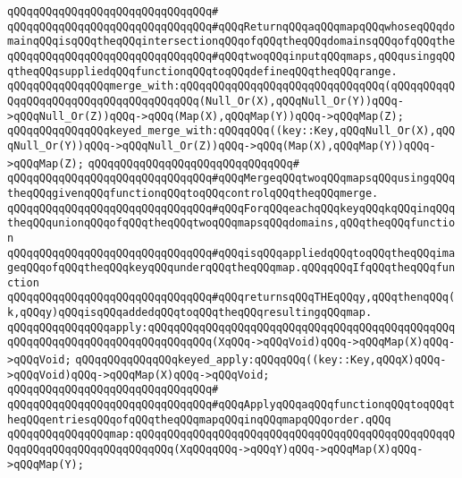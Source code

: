 \verb|qQQqqQQqqQQqqQQqqQQqqQQqqQQqqQQq#|\newline
\verb|qQQqqQQqqQQqqQQqqQQqqQQqqQQqqQQq#qQQqReturnqQQqaqQQqmapqQQqwhoseqQQqdomainqQQqisqQQqtheqQQqintersectionqQQqofqQQqtheqQQqdomainsqQQqofqQQqthe|\newline
\verb|qQQqqQQqqQQqqQQqqQQqqQQqqQQqqQQq#qQQqtwoqQQqinputqQQqmaps,qQQqusingqQQqtheqQQqsuppliedqQQqfunctionqQQqtoqQQqdefineqQQqtheqQQqrange.|\newline
\newline
\verb|qQQqqQQqqQQqqQQqmerge_with:qQQqqQQqqQQqqQQqqQQqqQQqqQQqqQQq(qQQqqQQqqQQqqQQqqQQqqQQqqQQqqQQqqQQqqQQq(Null_Or(X),qQQqNull_Or(Y))qQQq->qQQqNull_Or(Z))qQQq->qQQq(Map(X),qQQqMap(Y))qQQq->qQQqMap(Z);|\newline
\verb|qQQqqQQqqQQqqQQqkeyed_merge_with:qQQqqQQq((key::Key,qQQqNull_Or(X),qQQqNull_Or(Y))qQQq->qQQqNull_Or(Z))qQQq->qQQq(Map(X),qQQqMap(Y))qQQq->qQQqMap(Z);|\newline
\verb|qQQqqQQqqQQqqQQqqQQqqQQqqQQqqQQq#|\newline
\verb|qQQqqQQqqQQqqQQqqQQqqQQqqQQqqQQq#qQQqMergeqQQqtwoqQQqmapsqQQqusingqQQqtheqQQqgivenqQQqfunctionqQQqtoqQQqcontrolqQQqtheqQQqmerge.|\newline
\verb|qQQqqQQqqQQqqQQqqQQqqQQqqQQqqQQq#qQQqForqQQqeachqQQqkeyqQQqkqQQqinqQQqtheqQQqunionqQQqofqQQqtheqQQqtwoqQQqmapsqQQqdomains,qQQqtheqQQqfunction|\newline
\verb|qQQqqQQqqQQqqQQqqQQqqQQqqQQqqQQq#qQQqisqQQqappliedqQQqtoqQQqtheqQQqimageqQQqofqQQqtheqQQqkeyqQQqunderqQQqtheqQQqmap.qQQqqQQqIfqQQqtheqQQqfunction|\newline
\verb|qQQqqQQqqQQqqQQqqQQqqQQqqQQqqQQq#qQQqreturnsqQQqTHEqQQqy,qQQqthenqQQq(k,qQQqy)qQQqisqQQqaddedqQQqtoqQQqtheqQQqresultingqQQqmap.|\newline
\newline
\verb|qQQqqQQqqQQqqQQqapply:qQQqqQQqqQQqqQQqqQQqqQQqqQQqqQQqqQQqqQQqqQQqqQQqqQQqqQQqqQQqqQQqqQQqqQQqqQQqqQQq(XqQQq->qQQqVoid)qQQq->qQQqMap(X)qQQq->qQQqVoid;|\newline
\verb|qQQqqQQqqQQqqQQqkeyed_apply:qQQqqQQq((key::Key,qQQqX)qQQq->qQQqVoid)qQQq->qQQqMap(X)qQQq->qQQqVoid;|\newline
\verb|qQQqqQQqqQQqqQQqqQQqqQQqqQQqqQQq#|\newline
\verb|qQQqqQQqqQQqqQQqqQQqqQQqqQQqqQQq#qQQqApplyqQQqaqQQqfunctionqQQqtoqQQqtheqQQqentriesqQQqofqQQqtheqQQqmapqQQqinqQQqmapqQQqorder.qQQq|\newline
\newline
\verb|qQQqqQQqqQQqqQQqmap:qQQqqQQqqQQqqQQqqQQqqQQqqQQqqQQqqQQqqQQqqQQqqQQqqQQqqQQqqQQqqQQqqQQqqQQqqQQq(XqQQqqQQq->qQQqY)qQQq->qQQqMap(X)qQQq->qQQqMap(Y);|\newline

